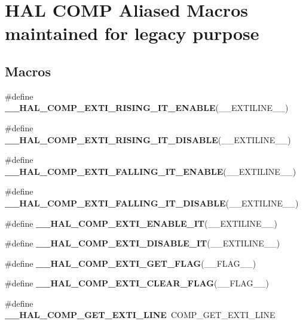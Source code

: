 \hypertarget{group___h_a_l___c_o_m_p___aliased___macros}{\section{H\-A\-L C\-O\-M\-P Aliased Macros maintained for legacy purpose}
\label{group___h_a_l___c_o_m_p___aliased___macros}
}
\subsection*{Macros}
\begin{DoxyCompactItemize}
\item 
\#define {\bfseries \-\_\-\-\_\-\-H\-A\-L\-\_\-\-C\-O\-M\-P\-\_\-\-E\-X\-T\-I\-\_\-\-R\-I\-S\-I\-N\-G\-\_\-\-I\-T\-\_\-\-E\-N\-A\-B\-L\-E}(\-\_\-\-\_\-\-E\-X\-T\-I\-L\-I\-N\-E\-\_\-\-\_\-)
\item 
\#define {\bfseries \-\_\-\-\_\-\-H\-A\-L\-\_\-\-C\-O\-M\-P\-\_\-\-E\-X\-T\-I\-\_\-\-R\-I\-S\-I\-N\-G\-\_\-\-I\-T\-\_\-\-D\-I\-S\-A\-B\-L\-E}(\-\_\-\-\_\-\-E\-X\-T\-I\-L\-I\-N\-E\-\_\-\-\_\-)
\item 
\#define {\bfseries \-\_\-\-\_\-\-H\-A\-L\-\_\-\-C\-O\-M\-P\-\_\-\-E\-X\-T\-I\-\_\-\-F\-A\-L\-L\-I\-N\-G\-\_\-\-I\-T\-\_\-\-E\-N\-A\-B\-L\-E}(\-\_\-\-\_\-\-E\-X\-T\-I\-L\-I\-N\-E\-\_\-\-\_\-)
\item 
\#define {\bfseries \-\_\-\-\_\-\-H\-A\-L\-\_\-\-C\-O\-M\-P\-\_\-\-E\-X\-T\-I\-\_\-\-F\-A\-L\-L\-I\-N\-G\-\_\-\-I\-T\-\_\-\-D\-I\-S\-A\-B\-L\-E}(\-\_\-\-\_\-\-E\-X\-T\-I\-L\-I\-N\-E\-\_\-\-\_\-)
\item 
\#define {\bfseries \-\_\-\-\_\-\-H\-A\-L\-\_\-\-C\-O\-M\-P\-\_\-\-E\-X\-T\-I\-\_\-\-E\-N\-A\-B\-L\-E\-\_\-\-I\-T}(\-\_\-\-\_\-\-E\-X\-T\-I\-L\-I\-N\-E\-\_\-\-\_\-)
\item 
\#define {\bfseries \-\_\-\-\_\-\-H\-A\-L\-\_\-\-C\-O\-M\-P\-\_\-\-E\-X\-T\-I\-\_\-\-D\-I\-S\-A\-B\-L\-E\-\_\-\-I\-T}(\-\_\-\-\_\-\-E\-X\-T\-I\-L\-I\-N\-E\-\_\-\-\_\-)
\item 
\#define {\bfseries \-\_\-\-\_\-\-H\-A\-L\-\_\-\-C\-O\-M\-P\-\_\-\-E\-X\-T\-I\-\_\-\-G\-E\-T\-\_\-\-F\-L\-A\-G}(\-\_\-\-\_\-\-F\-L\-A\-G\-\_\-\-\_\-)
\item 
\#define {\bfseries \-\_\-\-\_\-\-H\-A\-L\-\_\-\-C\-O\-M\-P\-\_\-\-E\-X\-T\-I\-\_\-\-C\-L\-E\-A\-R\-\_\-\-F\-L\-A\-G}(\-\_\-\-\_\-\-F\-L\-A\-G\-\_\-\-\_\-)
\item 
\hypertarget{group___h_a_l___c_o_m_p___aliased___macros_ga76e980c077c5398741f133b81091d5e9}{\#define {\bfseries \-\_\-\-\_\-\-H\-A\-L\-\_\-\-C\-O\-M\-P\-\_\-\-G\-E\-T\-\_\-\-E\-X\-T\-I\-\_\-\-L\-I\-N\-E}~C\-O\-M\-P\-\_\-\-G\-E\-T\-\_\-\-E\-X\-T\-I\-\_\-\-L\-I\-N\-E}\label{group___h_a_l___c_o_m_p___aliased___macros_ga76e980c077c5398741f133b81091d5e9}

\end{DoxyCompactItemize}


